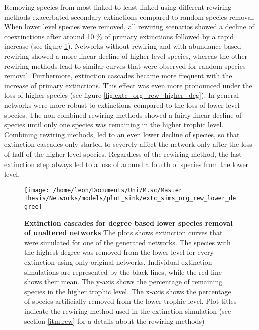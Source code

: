 \documentclass[12pt,a4paper]{article}
\begin{document}
Removing species from most linked to least linked using different rewiring methods exacerbated secondary extinctions compared to random species removal. When lower level species were removed, all rewiring scenarios showed a decline of coextinctions after around 10 \% of primary extinctions followed by a rapid increase (see figure \ref{fig:extc_org_rew_lower_deg}). Networks without rewiring and with abundance based rewiring showed a more linear decline of higher level species, whereas the other rewiring methods lead to similar curves that were observed for random species removal. Furthermore, extinction cascades became more frequent with the increase of primary extinctions. This effect was even more pronounced under the loss of higher species (see figure \ref{fig:extc_org_rew_higher_deg}). 
In general networks were more robust to extinctions compared to the loss of lower level species. The non-combined rewiring methods showed a fairly linear decline of species until only one species was remaining in the higher trophic level. Combining rewiring methods, led to an even lower decline of species, so that extinction cascades only started to severely affect the network only after the loss of half of the higher level species. Regardless of the rewiring method, the last extinction step always led to a loss of around a fourth of species from the lower level.
\begin{figure}[H]
	 \centering
	 \texttt{[image: /home/leon/Documents/Uni/M.sc/Master Thesis/Networks/models/plot\_sink/extc\_sims\_org\_rew\_lower\_degree]}
	 \captionsetup{width = \textwidth}
	 \caption[Extinction cascades for degree based lower species removal of unaltered networks]{\textbf{Extinction cascades for degree based lower species removal of unaltered networks} The plots shows extinction curves that were simulated for one of the generated networks. The species with the highest degree was removed from the lower level for every extinction using only original networks. Individual extinction simulations are represented by the black lines, while the red line shows their mean. The y-axis shows the percentage of remaining species in the higher trophic level. The x-axis shows the percentage of species artificially removed from the lower trophic level. Plot titles indicate the rewiring method used in the extinction simulation (see section \ref{itm:rew} for a details about the rewiring methods)}
	 \label{fig:extc_org_rew_lower_deg}
\end{figure}
\end{document}
